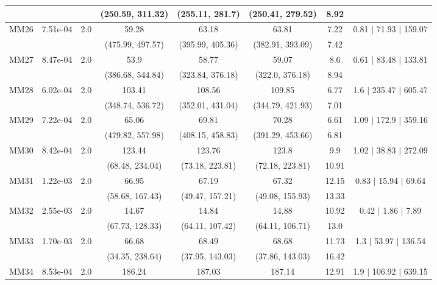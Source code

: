 \begin{longtable}{|c|c|c|c|c|c|c|c|}
	 &  &  & (250.59, 311.32) & (255.11, 281.7) & (250.41, 279.52) & 8.92 & \\
 	\hline
	\multirow{2}{*}{MM26} & \multirow{2}{*}{7.51e-04} & \multirow{2}{*}{2.0} & 59.28 & 63.18 & 63.81 & 7.22 & 0.81 $\mid$ 71.93 $\mid$ 159.07\\
	 &  &  & (475.99, 497.57) & (395.99, 405.36) & (382.91, 393.09) & 7.42 & \\
 	\hline
	\multirow{2}{*}{MM27} & \multirow{2}{*}{8.47e-04} & \multirow{2}{*}{2.0} & 53.9 & 58.77 & 59.07 & 8.6 & 0.61 $\mid$ 83.48 $\mid$ 133.81\\
	 &  &  & (386.68, 544.84) & (323.84, 376.18) & (322.0, 376.18) & 8.94 & \\
 	\hline
	\multirow{2}{*}{MM28} & \multirow{2}{*}{6.02e-04} & \multirow{2}{*}{2.0} & 103.41 & 108.56 & 109.85 & 6.77 & 1.6 $\mid$ 235.47 $\mid$ 605.47\\
	 &  &  & (348.74, 536.72) & (352.01, 431.04) & (344.79, 421.93) & 7.01 & \\
 	\hline
	\multirow{2}{*}{MM29} & \multirow{2}{*}{7.22e-04} & \multirow{2}{*}{2.0} & 65.06 & 69.81 & 70.28 & 6.61 & 1.09 $\mid$ 172.9 $\mid$ 359.16\\
	 &  &  & (479.82, 557.98) & (408.15, 458.83) & (391.29, 453.66) & 6.81 & \\
 	\hline
	\multirow{2}{*}{MM30} & \multirow{2}{*}{8.42e-04} & \multirow{2}{*}{2.0} & 123.44 & 123.76 & 123.8 & 9.9 & 1.02 $\mid$ 38.83 $\mid$ 272.09\\
	 &  &  & (68.48, 234.04) & (73.18, 223.81) & (72.18, 223.81) & 10.91 & \\
 	\hline
	\multirow{2}{*}{MM31} & \multirow{2}{*}{1.22e-03} & \multirow{2}{*}{2.0} & 66.95 & 67.19 & 67.32 & 12.15 & 0.83 $\mid$ 15.94 $\mid$ 69.64\\
	 &  &  & (58.68, 167.43) & (49.47, 157.21) & (49.08, 155.93) & 13.33 & \\
 	\hline
	\multirow{2}{*}{MM32} & \multirow{2}{*}{2.55e-03} & \multirow{2}{*}{2.0} & 14.67 & 14.84 & 14.88 & 10.92 & 0.42 $\mid$ 1.86 $\mid$ 7.89\\
	 &  &  & (67.73, 128.33) & (64.11, 107.42) & (64.11, 106.71) & 13.0 & \\
 	\hline
	\multirow{2}{*}{MM33} & \multirow{2}{*}{1.70e-03} & \multirow{2}{*}{2.0} & 66.68 & 68.49 & 68.68 & 11.73 & 1.3 $\mid$ 53.97 $\mid$ 136.54\\
	 &  &  & (34.35, 238.64) & (37.95, 143.03) & (37.86, 143.03) & 16.42 & \\
 	\hline
	\multirow{2}{*}{MM34} & \multirow{2}{*}{8.53e-04} & \multirow{2}{*}{2.0} & 186.24 & 187.03 & 187.14 & 12.91 & 1.9 $\mid$ 106.92 $\mid$ 639.15\\

\end{longtable}
